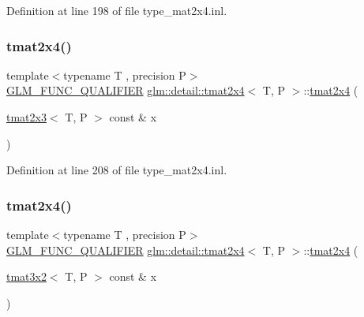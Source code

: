 Definition at line 198 of file type\+\_\+mat2x4.\+inl.

\mbox{\label{structglm_1_1detail_1_1tmat2x4_a03a38c13272b397389f748a852b70bbd}} 
\subsubsection{\texorpdfstring{tmat2x4()}{tmat2x4()}\hspace{0.1cm}{\footnotesize\ttfamily [14/22]}}
{\footnotesize\ttfamily template$<$typename T , precision P$>$ \\
\hyperlink{setup_8hpp_a33fdea6f91c5f834105f7415e2a64407}{G\+L\+M\+\_\+\+F\+U\+N\+C\+\_\+\+Q\+U\+A\+L\+I\+F\+I\+ER} \hyperlink{structglm_1_1detail_1_1tmat2x4}{glm\+::detail\+::tmat2x4}$<$ T, P $>$\+::\hyperlink{structglm_1_1detail_1_1tmat2x4}{tmat2x4} (\begin{DoxyParamCaption}\item[{\hyperlink{structglm_1_1detail_1_1tmat2x3}{tmat2x3}$<$ T, P $>$ const \&}]{x }\end{DoxyParamCaption})\hspace{0.3cm}{\ttfamily [explicit]}}



Definition at line 208 of file type\+\_\+mat2x4.\+inl.

\mbox{\label{structglm_1_1detail_1_1tmat2x4_afc4a553b87823b8a974f0f9633fbe21b}} 
\subsubsection{\texorpdfstring{tmat2x4()}{tmat2x4()}\hspace{0.1cm}{\footnotesize\ttfamily [15/22]}}
{\footnotesize\ttfamily template$<$typename T , precision P$>$ \\
\hyperlink{setup_8hpp_a33fdea6f91c5f834105f7415e2a64407}{G\+L\+M\+\_\+\+F\+U\+N\+C\+\_\+\+Q\+U\+A\+L\+I\+F\+I\+ER} \hyperlink{structglm_1_1detail_1_1tmat2x4}{glm\+::detail\+::tmat2x4}$<$ T, P $>$\+::\hyperlink{structglm_1_1detail_1_1tmat2x4}{tmat2x4} (\begin{DoxyParamCaption}\item[{\hyperlink{structglm_1_1detail_1_1tmat3x2}{tmat3x2}$<$ T, P $>$ const \&}]{x }\end{DoxyParamCaption})\hspace{0.3cm}{\ttfamily [explicit]}}



